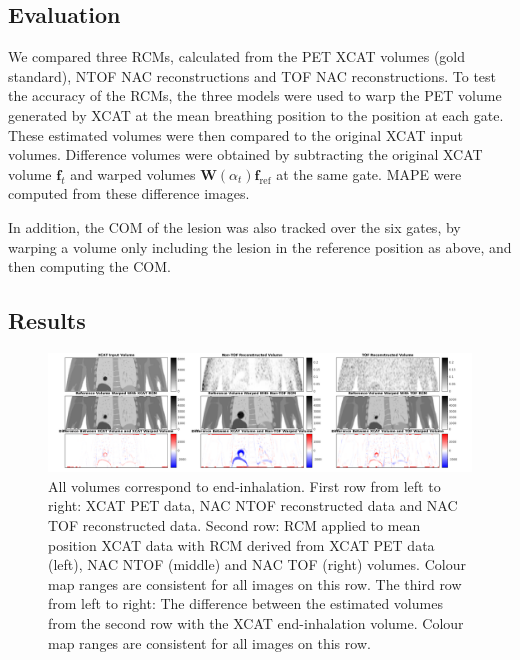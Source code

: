             \subsection{Evaluation} \label{impact_of_tof_on_respiratory_motion_modelling_using_nac_pet_methods_evaluation}
                We compared three \gls{RCM}s, calculated from the \gls{PET} \gls{XCAT} volumes (gold standard), \gls{NTOF} \gls{NAC} reconstructions and \gls{TOF} \gls{NAC} reconstructions. To test the accuracy of the \gls{RCM}s, the three models were used to warp the \gls{PET} volume generated by \gls{XCAT} at the mean breathing position to the position at each gate. These estimated volumes were then compared to the original \gls{XCAT} input volumes. Difference volumes were obtained by subtracting the original \gls{XCAT} volume $\mathbf{f}_t$ and warped volumes $\mathbf{W}(\alpha_t) \mathbf{f}_\mathrm{ref}$ at the same gate. \gls{MAPE} were computed from these difference images.
                
                In addition, the \gls{COM} of the lesion was also tracked over the six gates, by warping a volume only including the lesion in the reference position as above, and then computing the \gls{COM}.
            
        \subsection{Results} \label{impact_of_tof_on_respiratory_motion_modelling_using_nac_pet_results}
            \begin{figure}
                \centering
                
                \includegraphics[width=1.0\linewidth]{figures/output.png}
                
                \captionsetup{singlelinecheck=false, justification=raggedright}
                \caption{All volumes correspond to end-inhalation. First row from left to right: \gls{XCAT} \gls{PET} data, \gls{NAC} \gls{NTOF} reconstructed data and \gls{NAC} \gls{TOF} reconstructed data. Second row: \gls{RCM} applied to mean position \gls{XCAT} data with \gls{RCM} derived from \gls{XCAT} \gls{PET} data (left), \gls{NAC} \gls{NTOF} (middle) and \gls{NAC} \gls{TOF} (right) volumes. Colour map ranges are consistent for all images on this row. The third row from left to right: The difference between the estimated volumes from the second row with the \gls{XCAT} end-inhalation volume. Colour map ranges are consistent for all images on this row.} \label{fig:output}
            \end{figure}
            
